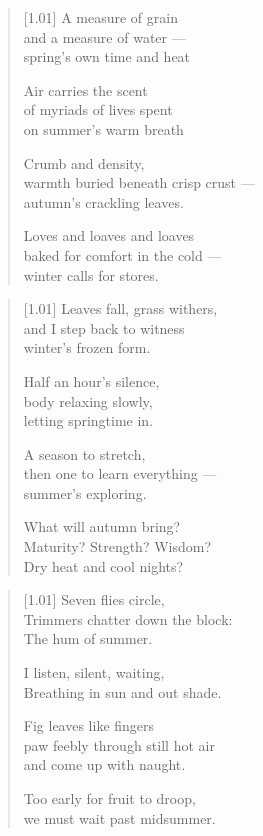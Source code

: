 

\null
\vfill

\begin{verse}[1.01\textwidth]
  A measure of grain\\
  and a measure of water ---\\
  spring's own time and heat

  Air carries the scent\\
  of myriads of lives spent\\
  on summer's warm breath

  Crumb and density,\\
  warmth buried beneath crisp crust ---\\
  autumn's crackling leaves.

  Loves and loaves and loaves\\
  baked for comfort in the cold ---\\
  winter calls for stores.
\end{verse}

\vfill

\newpage

\null
\vfill

\begin{verse}[1.01\textwidth]
  Leaves fall, grass withers,\\
  and I step back to witness\\
  winter's frozen form.

  Half an hour's silence,\\
  body relaxing slowly,\\
  letting springtime in.

  A season to stretch,\\
  then one to learn everything ---\\
  summer's exploring.

  What will autumn bring?\\
  Maturity? Strength? Wisdom?\\
  Dry heat and cool nights?
\end{verse}

\vfill

\newpage

\null
\vfill

\begin{verse}[1.01\textwidth]
    Seven flies circle,\\
    Trimmers chatter down the block:\\
    The hum of summer.

    \vin I listen, silent, waiting,\\
    \vin Breathing in sun and out shade.

    Fig leaves like fingers\\
    paw feebly through still hot air\\
    and come up with naught.

    \vin Too early for fruit to droop,\\
    \vin we must wait past midsummer.
  \end{verse}


